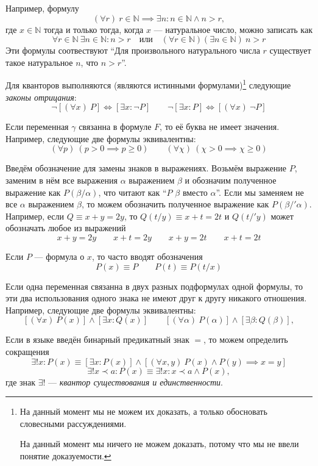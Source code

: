 Например, формулу
\newcommand\N{\mathbb N}
\begin{equation}\label{eq:nat_unbound}
  (\forall r)~r\in\N\implies \exists n:n\in\N\land n>r,
\end{equation}
где $x\in\N$ тогда и только тогда, когда $x$ --- натуральное число, можно записать как
\[
  \forall r\in\N~\exists n\in\N:n>r\quad\text{или}\quad
  (\forall r\in\N)(\exists n\in\N)~n>r
\]
Эти формулы соотвествуют ``Для произвольного натурального числа
$r$ существует такое натуральное $n$, что $n>r$''.

Для кванторов выполняются (являются истинными формулами)\footnote{
  На данный момент мы не можем их доказать, а только
  обосновать словесными рассуждениями.

  На данный момент мы ничего не можем доказать, потому что мы не ввели
  понятие доказуемости.}
следующие {\it законы отрицания}:
\[
  \lnot[(\forall x)~P]\iff[\exists x:\lnot P]\qquad
  \lnot[\exists x:P]\iff[(\forall x)~\lnot P]
\]

Если переменная $\gamma$ связанна в формуле $F$, то её буква не имеет значения.
Например, следующие две формулы эквивалентны:
\[
  (\forall p)~(p>0\implies p \geq 0)\qquad
  (\forall \chi)~(\chi>0\implies \chi\geq 0)
\]

Введём обозначение для замены знаков в выражениях.
Возьмём выражение $P$, заменим в нём все выражения $\alpha$ выражением $\beta$ и
обозначим полученное выражение как $P(\beta/\alpha)$, что читают как
``$P$ $\beta$ вместо $\alpha$''.
Если мы заменяем не все $\alpha$ выражением $\beta$, то можем обозначить полученное
выражение как $P(\beta/'\alpha)$.
Например, если $Q\equiv x+y=2y$, то $Q(t/y)\equiv x+t=2t$ и $Q(t/'y)$ может
обозначать любое из выражений
\[
  x+y=2y\qquad x+t=2y\qquad x+y=2t\qquad x+t=2t
\]

Если $P$ --- формула о $x$, то часто вводят обозначения
\[
  P(x)\equiv P\qquad P(t)\equiv P(t/x)
\]

Если одна переменная связанна в двух разных подформулах
одной формулы, то эти два использования
одного знака не имеют друг к другу никакого отношения.
Например, следующие две формулы эквивалентны:
\[
  [(\forall x)~P(x)]\land[\exists x:Q(x)]\qquad
  [(\forall \alpha)~P(\alpha)]\land[\exists \beta:Q(\beta)],
\]

\label{page:exists_only}
Если в языке введён бинарный предикатный знак $=$, то
можем определить сокращения
\[
  \exists! x:P(x)\equiv[\exists x:P(x)]\land
  [(\forall x,y)~P(x)\land P(y)\implies x=y]
\]
\[
  \exists! x\prec a:P(x)\equiv \exists! x:x\prec a\land P(x),
\]
где знак $\exists!$ --- {\it квантор существования и единственности}.

